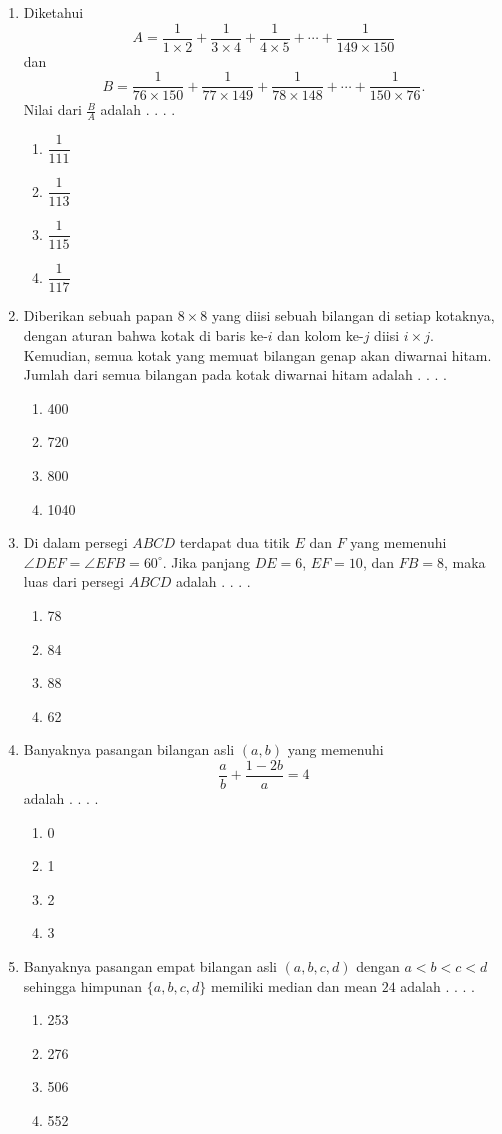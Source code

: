 \documentclass[12pt]{scrartcl}
\begin{document}
\begin{enumerate}
    \item Diketahui
    $$ A =\frac{1}{1\times 2} + \frac{1}{3\times 4}+\frac{1}{4\times 5}+\cdots + \frac{1}{149\times 150} $$
    dan 
    $$ B =\frac{1}{76\times 150} + \frac{1}{77\times 149} + \frac{1}{78\times 148}+\cdots + \frac{1}{150\times 76}. $$
    Nilai dari $\frac{B}{A}$ adalah . . . .
    \begin{enumerate}[label={(\Alph*)}]
        \item $\dfrac{1}{111}$ \item $\dfrac{1}{113}$ \item $\dfrac{1}{115}$ \item $\dfrac{1}{117}$
    \end{enumerate}

    \item Diberikan sebuah papan $8\times 8$ yang diisi sebuah bilangan di setiap kotaknya, dengan aturan bahwa kotak di baris ke-$i$ dan kolom ke-$j$ diisi $i\times j$. Kemudian, semua kotak yang memuat bilangan genap akan diwarnai hitam. Jumlah dari semua bilangan pada kotak diwarnai hitam adalah . . . .
    \begin{enumerate}[label={(\Alph*)}]
        \item 400 \item 720 \item 800 \item 1040
    \end{enumerate}

    \item Di dalam persegi $ABCD$ terdapat dua titik $E$ dan $F$ yang memenuhi $\angle DEF=\angle EFB=60^\circ$. Jika panjang $DE=6$, $EF=10$, dan $FB=8$, maka luas dari persegi $ABCD$ adalah . . . .
    \begin{enumerate}[label={(\Alph*)}]
        \item 78 \item 84 \item 88 \item 62
    \end{enumerate}

    \item Banyaknya pasangan bilangan asli $(a,b)$ yang memenuhi
    $$\frac{a}{b} + \frac{1-2b}{a} =4$$
    adalah . . . .
    \begin{enumerate}[label={(\Alph*)}]
        \item 0 \item 1 \item 2 \item 3
    \end{enumerate}

    \item Banyaknya pasangan empat bilangan asli $(a,b,c,d)$ dengan $a<b<c<d$ sehingga himpunan $\{a,b,c,d\}$ memiliki median dan mean $24$ adalah . . . .
    \begin{enumerate}[label={(\Alph*)}]
        \item 253 \item 276 \item 506 \item 552
    \end{enumerate}

\end{enumerate}
\end{document}
